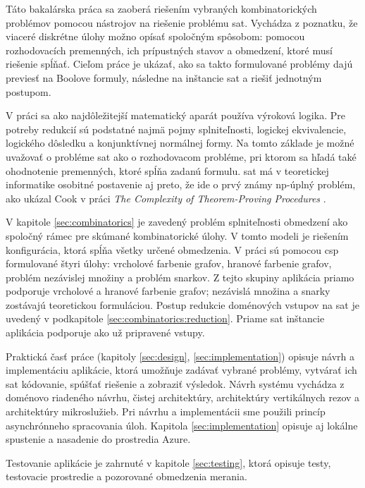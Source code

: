 Táto bakalárska práca sa zaoberá riešením vybraných kombinatorických problémov pomocou nástrojov na riešenie problému \acrfull{sat}. Vychádza z poznatku, že viaceré diskrétne úlohy možno opísať spoločným spôsobom: pomocou rozhodovacích premenných, ich prípustných stavov a obmedzení, ktoré musí riešenie spĺňať. Cieľom práce je ukázať, ako sa takto formulované problémy dajú previesť na Boolove formuly, následne na inštancie \acrshort{sat} a riešiť jednotným postupom.

V práci sa ako najdôležitejší matematický aparát používa výroková logika. Pre potreby redukcií sú podstatné najmä pojmy splniteľnosti, logickej ekvivalencie, logického dôsledku a konjunktívnej normálnej formy. Na tomto základe je možné uvažovať o probléme \acrshort{sat} ako o rozhodovacom probléme, pri ktorom sa hľadá také ohodnotenie premenných, ktoré spĺňa zadanú formulu. \Acrshort{sat} má v teoretickej informatike osobitné postavenie aj preto, že ide o prvý známy \Acrshort{np}-úplný problém, ako ukázal Cook v práci \textit{The Complexity of Theorem-Proving Procedures} \cite{Cook1971}.

V kapitole \ref{sec:combinatorics} je zavedený problém splniteľnosti obmedzení ako spoločný rámec pre skúmané kombinatorické úlohy. V tomto modeli je riešením konfigurácia, ktorá spĺňa všetky určené obmedzenia. V práci sú pomocou \acrshort{csp} formulované štyri úlohy: vrcholové farbenie grafov, hranové farbenie grafov, problém nezávislej množiny a problém snarkov. Z tejto skupiny aplikácia priamo podporuje vrcholové a hranové farbenie grafov; nezávislá množina a snarky zostávajú teoretickou formuláciou. Postup redukcie doménových vstupov na \acrshort{sat} je uvedený v podkapitole \ref{sec:combinatorics:reduction}. Priame \acrshort{sat} inštancie aplikácia podporuje ako už pripravené vstupy.

Praktická časť práce (kapitoly \ref{sec:design}, \ref{sec:implementation}) opisuje návrh a implementáciu aplikácie, ktorá umožňuje zadávať vybrané problémy, vytvárať ich \acrshort{sat} kódovanie, spúšťať riešenie a zobraziť výsledok. Návrh systému vychádza z doménovo riadeného návrhu, čistej architektúry, architektúry vertikálnych rezov a architektúry mikroslužieb. Pri návrhu a implementácii sme použili princíp asynchrónneho spracovania úloh. Kapitola \ref{sec:implementation} opisuje aj lokálne spustenie a nasadenie do prostredia Azure.

Testovanie aplikácie je zahrnuté v kapitole \ref{sec:testing}, ktorá opisuje testy, testovacie prostredie a pozorované obmedzenia merania.
